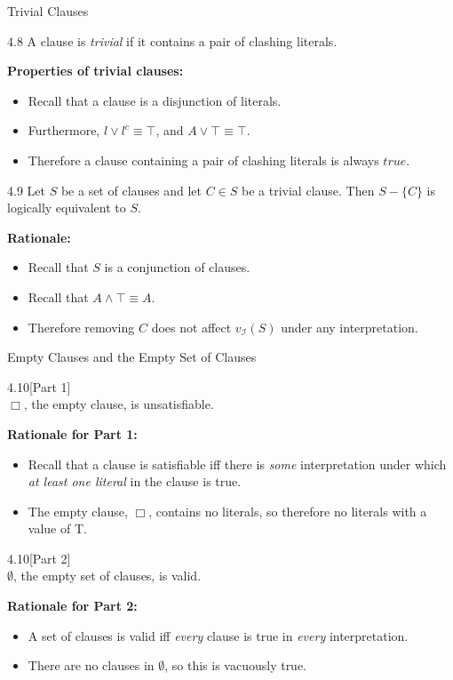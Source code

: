 \documentclass[style=sailor,size=12pt]{powerdot}
\begin{document}
\begin{wideslide}[bm=,toc=]{Trivial Clauses}
\begin{defn}{4.8}
A clause is \emph{trivial} if it contains a pair of clashing literals.
\end{defn}
\pause
\textbf{Properties of trivial clauses:}
\begin{itemize}
\item<3-> Recall that a clause is a disjunction of literals.
\item<4-> Furthermore, $l \lor l^c \equiv \top$, and $A \lor \top \equiv \top$.
\item<5-> Therefore a clause containing a pair of clashing literals is always $true$.
\end{itemize} 
\pause[4]
\begin{lem}{4.9}
Let $S$ be a set of clauses and let $C \in S$ be a trivial clause. Then $S -
\{C\}$ is logically equivalent to $S$.
\end{lem}
\pause
\textbf{Rationale:}
\begin{itemize}
\item<8-> Recall that $S$ is a conjunction of clauses.
\item<9-> Recall that $A \land \top \equiv A$.
\item<10-> Therefore removing $C$ does not affect $v_{\mathcal{I}}(S)$ under any
interpretation. 
\end{itemize}
\end{wideslide}

\begin{wideslide}[bm=,toc=]{Empty Clauses and the Empty Set of Clauses}
\begin{lem}{4.10}[Part 1]\label{lem:resolution}
~\\$\Box$, the empty clause, is unsatisfiable. 
\end{lem}
\pause
\textbf{Rationale for Part 1:}
\begin{itemize}
\item Recall that a clause is satisfiable iff there is \emph{some} interpretation
under which \emph{at least one literal} in the clause is true.
\item The empty clause, $\Box$, contains no literals, so therefore no literals with a value of T.
\end{itemize}

\pause
\begin{lem}{4.10}[Part 2]\label{lem:resolution}
~\\$\emptyset$, the empty set of clauses, is valid.
\end{lem}
\pause
\textbf{Rationale for Part 2:}
\begin{itemize}
\item A set of clauses is valid iff \emph{every} clause is true in
\emph{every} interpretation.
\item There are no clauses in $\emptyset$, so this is vacuously true.
\end{itemize}

\end{wideslide}
\end{document}
